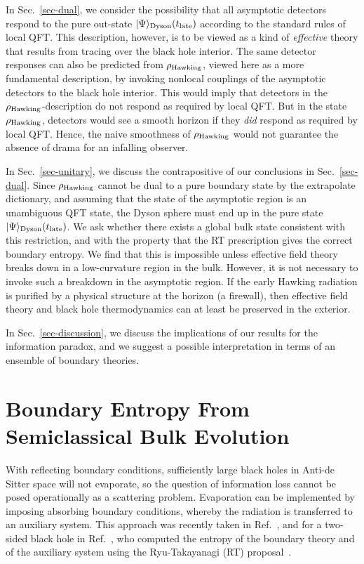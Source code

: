 \documentclass[12pt,letterpaper]{article}
\begin{document}
In Sec.~\ref{sec-dual}, we consider the possibility that all asymptotic detectors respond to the pure out-state $|\Psi\rangle_{\rm Dyson}(t_{\rm late})$ according to the standard rules of local QFT. This description, however, is to be viewed as a kind of {\em effective} theory that results from tracing over the black hole interior. The same detector responses can also be predicted from $\rho_{\rm Hawking}$, viewed here as a more fundamental description, by invoking nonlocal couplings of the asymptotic detectors to the black hole interior. This would imply that detectors in the $\rho_{\rm Hawking}$-description do not respond as required by local QFT. But in the state $\rho_{\rm Hawking}$, detectors would see a smooth horizon if they {\em did} respond as required by local QFT. Hence, the naive smoothness of $\rho_{\rm Hawking}$ would not guarantee the absence of drama for an infalling observer.

In Sec.~\ref{sec-unitary}, we discuss the contrapositive of our conclusions in Sec.~\ref{sec-dual}. Since $\rho_{\rm Hawking}$ cannot be dual to a pure boundary state by the extrapolate dictionary, and assuming that the state of the asymptotic region is an unambiguous QFT state, the Dyson sphere must end up in the pure state $|\Psi\rangle_{\rm Dyson}(t_{\rm late})$. We ask whether there exists a global bulk state consistent with this restriction, and with the property that the RT prescription gives the correct boundary entropy. We find that this is impossible unless effective field theory breaks down in a low-curvature region in the bulk. However, it is not necessary to invoke such a breakdown in the asymptotic region. If the early Hawking radiation is purified by a physical structure at the horizon (a firewall), then effective field theory and black hole thermodynamics can at least be preserved in the exterior.

In Sec.~\ref{sec-discussion}, we discuss the implications of our results for the information paradox, and we suggest a possible interpretation in terms of an ensemble of boundary theories.


\section{Boundary Entropy From Semiclassical Bulk Evolution}
\label{sec-dyson}

With reflecting boundary conditions, sufficiently large black holes in Anti-de Sitter space will not evaporate, so the question of information loss cannot be posed operationally as a scattering problem. Evaporation can be implemented by imposing absorbing boundary conditions, whereby the radiation is transferred to an auxiliary system. This approach was recently taken in Ref.~\cite{Pen19}, and for a two-sided black hole in Ref.~\cite{AEMM}, who computed the entropy of the boundary theory and of the auxiliary system using the Ryu-Takayanagi (RT) proposal~\cite{RyuTak06,HubRan07,FauLew13,EngWal14}.
\end{document}
